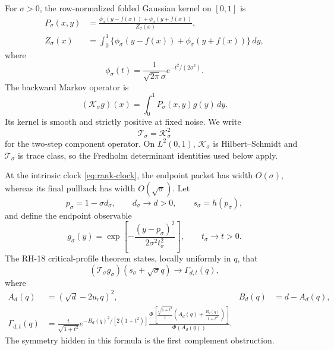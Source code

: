 \documentclass[11pt]{article}
\theoremstyle{definition}
\theoremstyle{remark}
\newcommand{\uc}{u_{\mathrm c}}
\newcommand{\cK}{\mathcal K}
\newcommand{\cT}{\mathcal T}
\begin{document}
For $\sigma>0$, the row-normalized folded Gaussian kernel on $[0,1]$ is
\begin{align}
 P_\sigma(x,y)
 &=\frac{\phi_\sigma(y-f(x))+\phi_\sigma(y+f(x))}
 {Z_\sigma(x)},
 \label{eq:folded-kernel}\\
 Z_\sigma(x)
 &=\int_0^1
 \{\phi_\sigma(y-f(x))+\phi_\sigma(y+f(x))\}\,dy,
 \label{eq:row-normalization}
\end{align}
where
\begin{equation}\label{eq:normal-density}
 \phi_\sigma(t)=\frac1{\sqrt{2\pi}\sigma}e^{-t^2/(2\sigma^2)}.
\end{equation}
The backward Markov operator is
\begin{equation}\label{eq:markov-operator}
 (\cK_\sigma g)(x)=\int_0^1P_\sigma(x,y)g(y)\,dy.
\end{equation}
Its kernel is smooth and strictly positive at fixed noise.  We write
\begin{equation}\label{eq:T-definition}
 \cT_\sigma=\cK_\sigma^2
\end{equation}
for the two-step component operator.  On $L^2(0,1)$,
$\cK_\sigma$ is Hilbert--Schmidt and $\cT_\sigma$ is trace class, so the
Fredholm determinant identities used below apply.

At the intrinsic clock \eqref{eq:rank-clock}, the endpoint packet has width
$O(\sigma)$, whereas its final pullback has width $O(\sqrt\sigma)$.  Let
\begin{equation}\label{eq:critical-scaling}
 p_\sigma=1-\sigma d_\sigma,
 \qquad d_\sigma\to d>0,
 \qquad s_\sigma=h(p_\sigma),
\end{equation}
and define the endpoint observable
\begin{equation}\label{eq:endpoint-observable}
 g_\sigma(y)
 =\exp\!\left[-\frac{(y-p_\sigma)^2}
 {2\sigma^2t_\sigma^2}\right],
 \qquad t_\sigma\to t>0.
\end{equation}
The RH-18 critical-profile theorem states, locally uniformly in $q$, that
\begin{equation}\label{eq:critical-limit}
 (\cT_\sigma g_\sigma)(s_\sigma+\sqrt\sigma q)
 \longrightarrow\Gamma_{d,t}(q),
\end{equation}
where
\begin{align}
 A_d(q)&=(\sqrt d-2\uc q)^2,
 &B_d(q)&=d-A_d(q),
 \label{eq:A-B}\\
 \Gamma_{d,t}(q)
 &=\frac{t}{\sqrt{1+t^2}}
 e^{-B_d(q)^2/[2(1+t^2)]}
 \frac{
 \Phi\!\left[
 \frac{\sqrt{1+t^2}}t
 \left(A_d(q)+\frac{B_d(q)}{1+t^2}\right)
 \right]}
 {\Phi(A_d(q))}.
 \label{eq:Gamma}
\end{align}
The symmetry hidden in this formula is the first complement obstruction.
\end{document}
